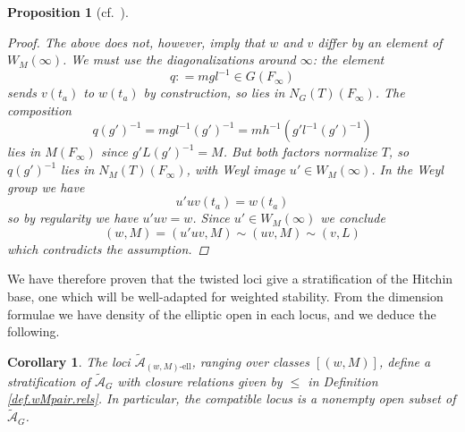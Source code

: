 \documentclass[openany]{amsbook}
\newtheorem{proposition}[theorem]{Proposition}
\newtheorem{corollary}[theorem]{Corollary}
\theoremstyle{definition}
\theoremstyle{remark}
\numberwithin{equation}{section}
\newcommand{\cA}{\mathcal{A}}
\renewcommand{\-}{\operatorname{-}}
\newcommand{\el}{\text{-ell}}
\newcommand{\ctA}{\widetilde{\cA}}
\newcommand{\ctAe}[2]{\ctA_{(#1, #2)\el}}
\begin{document}
\begin{proposition}[{{cf.\ \cite[\S 3.10]{CLI}}}]
\begin{proof}
        The above does not, however, imply that $w$ and $v$ differ by an element of $W_M(\infty)$. We must use the diagonalizations around $\infty$: the element
        $$
            q : = m g l^{-1} \in G(F_\infty)
        $$
        sends $v(t_a)$ to $w(t_a)$ by construction, so lies in $N_G(T)(F_\infty)$. The composition
        $$
            q (g')^{-1} = m g l^{-1} (g')^{-1} = m h^{-1} (g' l^{-1} (g')^{-1})
        $$
        lies in $M(F_\infty)$ since $g' L (g')^{-1} = M$. But both factors normalize $T$, so $q (g')^{-1}$ lies in $N_M(T)(F_\infty)$, with Weyl image $u' \in W_M(\infty)$. In the Weyl group we have
        $$
            u' u v(t_a) = w(t_a)
        $$
        so by regularity we have $u' u v = w$. Since $u' \in W_M(\infty)$ we conclude
        $$
            (w, M) = (u' u v, M) \sim (u v, M) \sim (v, L)
        $$
        which contradicts the assumption.
        
                        
                                                            \end{proof}
\end{proposition}

We have therefore proven that the twisted loci give a stratification of the Hitchin base, one which will be well-adapted for weighted stability. From the dimension formulae we have density of the elliptic open in each locus, and we deduce the following.
\begin{corollary}\label{cor.ell.strat.tw}
    The loci $\ctAe{w}{M}$, ranging over classes $[(w,M)]$, define a stratification of $\ctA_{G}$ with closure relations given by $\le$ in Definition \ref{def.wMpair.rels}. In particular, the compatible locus is a nonempty open subset of $\ctA_G$.
\end{corollary}
\end{document}
